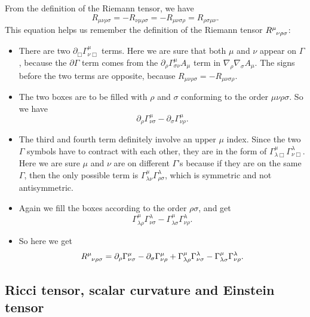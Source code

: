 \documentclass[hyperref, a4paper]{article}
\begin{document}
From the definition of the Riemann tensor, we have 
\begin{equation}
    R_{\mu \nu \rho \sigma} = - R_{\nu \mu \rho \sigma} = - R_{\mu \nu \sigma \rho} = R_{\rho \sigma \mu \nu}.
    \label{eq:r-tensor-symmetry}
\end{equation}
This equation helps us remember the definition of the Riemann tensor $R\indices{^\mu_{\nu \rho \sigma}}$:
\begin{itemize}
    \item There are two $\partial_\Box \Gamma^\mu_{\nu \Box}$ terms. Here we are sure that both $\mu$ and $\nu$
    appear on $\Gamma$, because the $\partial \Gamma$ term comes from the $\partial_\rho \Gamma^\mu_{\sigma \nu} A_\mu$ term in $\nabla_\rho \nabla_\sigma A_\mu$. 
    The signs before the two terms are opposite, because $R_{\mu \nu \rho \sigma} = - R_{\mu \nu \sigma \rho}$.
    \item The two boxes are to be filled with $\rho$ and $\sigma$ conforming to the order $\mu \nu \rho \sigma$.
    So we have 
    \[
        \partial_\rho \Gamma^\mu_{\nu \sigma} - \partial_\sigma \Gamma^\mu_{\nu \rho}.
    \]
    \item The third and fourth term definitely involve an upper $\mu$ index. Since the two $\Gamma$ symbols 
    have to contract with each other, they are in the form of $\Gamma^\mu_{\lambda \Box} \Gamma^\lambda_{\nu \Box}$.
    Here we are sure $\mu$ and $\nu$ are on different $\Gamma$'s because if they are on the same $\Gamma$, then 
    the only possible term is $\Gamma^{\mu}_{\lambda \nu} \Gamma^{\lambda}_{\rho \sigma}$, which is symmetric and 
    not antisymmetric.
    \item Again we fill the boxes according to the order $\rho \sigma$, and get 
    \[
        \Gamma^\mu_{\lambda \rho} \Gamma^\lambda_{\nu \sigma} - \Gamma^\mu_{\lambda \sigma} \Gamma^\lambda_{\nu \rho}.
    \]
    \item So here we get 
    \begin{equation}
        R\indices{^\mu_{\nu \rho \sigma}} = \partial_\rho \Gamma^\mu_{\nu \sigma} - \partial_\sigma \Gamma^\mu_{\nu \rho} + \Gamma^\mu_{\lambda \rho} \Gamma^\lambda_{\nu \sigma} - \Gamma^\mu_{\lambda \sigma} \Gamma^\lambda_{\nu \rho}.
    \end{equation}
\end{itemize}

\subsection{Ricci tensor, scalar curvature and Einstein tensor}
\end{document}
